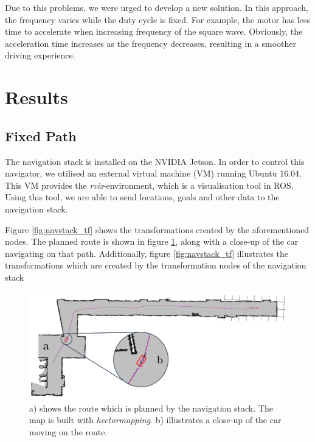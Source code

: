 \documentclass[conference,a4paper]{IEEEtran}
\begin{document}
Due to this problems, we were urged to develop a new solution. In this approach, the frequency varies while the duty cycle is fixed. For example, the motor has less time to accelerate when increasing frequency of the square wave. Obviously, the acceleration time increases as the frequency decreases, resulting in a smoother driving experience.

\section{Results}
\label{sec:Results}
\subsection{Fixed Path}
The navigation stack is installed on the NVIDIA Jetson. In order to control this navigator, we utilised an external virtual machine (VM) running Ubuntu 16.04. This VM provides the \emph{rviz}-environment, which is a visualisation tool in ROS. Using this tool, we are able to send locations, goals and other data to the navigation stack. 

Figure \ref{fig:navstack_tf} shows the transformations created by the aforementioned nodes. The planned route is shown in figure \ref{fig:navstack_result}, along with a close-up of the car navigating on that path. Additionally, figure \ref{fig:navstack_tf} illustrates the transformations which are created by the transformation nodes of the navigation stack

\begin{figure}[!t]
	\includegraphics[width=\columnwidth]{navstack_result_1}
	\centering
	\caption{a) shows the route which is planned by the navigation stack. The map is built with \emph{hector\textunderscore mapping}\cite{Kohlbrecher2012}. b) illustrates a close-up of the car moving on the route. }
	\label{fig:navstack_result}
\end{figure}
\end{document}
